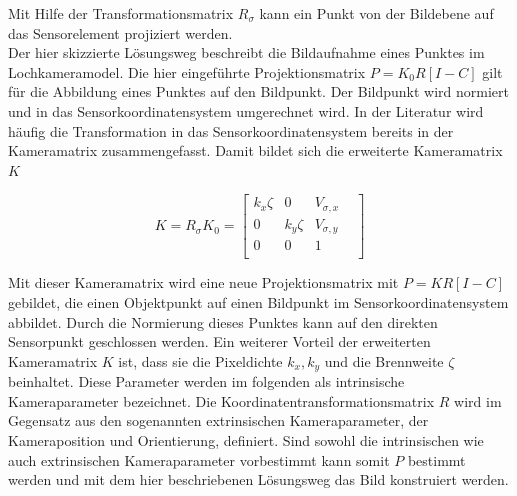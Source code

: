 Mit Hilfe der Transformationsmatrix $R_\sigma$ kann ein Punkt von der Bildebene auf das Sensorelement projiziert werden.\\

Der hier skizzierte Lösungsweg beschreibt die Bildaufnahme eines Punktes im Lochkameramodel. Die hier eingeführte Projektionsmatrix $P=K_0R[I -C]$ gilt für die Abbildung eines Punktes auf den Bildpunkt. Der Bildpunkt wird normiert und in das Sensorkoordinatensystem umgerechnet wird. In der Literatur wird häufig die Transformation in das Sensorkoordinatensystem bereits in der Kameramatrix zusammengefasst. Damit bildet sich die erweiterte Kameramatrix $K$

\begin{equation}
K=	R_\sigma K_0=  \begin{bmatrix}
k_x \zeta & 0 & V_{\sigma,x}\\
0 & k_y \zeta & V_{\sigma,y}\\
0 & 0   & 1 &\\
\end{bmatrix}
\end{equation}

Mit dieser Kameramatrix wird eine neue Projektionsmatrix mit $P=KR[I -C]$ gebildet, die einen Objektpunkt auf einen Bildpunkt im Sensorkoordinatensystem abbildet. Durch die Normierung dieses Punktes kann auf den direkten Sensorpunkt geschlossen werden. 
Ein weiterer Vorteil der erweiterten Kameramatrix $K$ ist, dass sie die Pixeldichte $k_x,k_y$ und die Brennweite $\zeta$ beinhaltet. Diese Parameter werden im folgenden als intrinsische Kameraparameter bezeichnet. Die Koordinatentransformationsmatrix $R$ wird im Gegensatz aus den sogenannten extrinsischen Kameraparameter, der Kameraposition und Orientierung, definiert. Sind sowohl die intrinsischen wie auch extrinsischen Kameraparameter vorbestimmt kann somit $P$ bestimmt werden und mit dem hier beschriebenen Lösungsweg das Bild konstruiert werden. %




